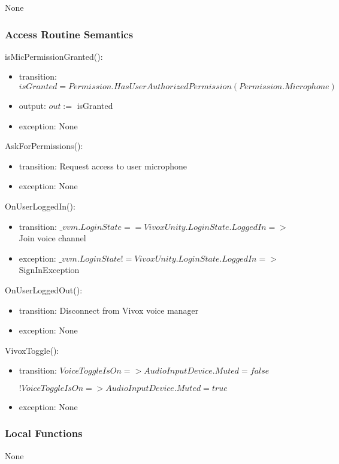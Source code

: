\documentclass[12pt, titlepage]{article}
\begin{document}
None\\

\subsubsection{Access Routine Semantics}

\noindent isMicPermissionGranted():
\begin{itemize}
\item transition: $isGranted = Permission.HasUserAuthorizedPermission(Permission.Microphone)$
\item output: $out :=$ isGranted
\item exception: None
\end{itemize}

\noindent AskForPermissions():
\begin{itemize}
\item transition: Request access to user microphone
\item exception: None
\end{itemize}

\noindent OnUserLoggedIn():
\begin{itemize}
\item transition: $\_vvm.LoginState == VivoxUnity.LoginState.LoggedIn =>$ Join voice channel
\item exception: $\_vvm.LoginState != VivoxUnity.LoginState.LoggedIn =>$ SignInException
\end{itemize}

\noindent OnUserLoggedOut():
\begin{itemize}
\item transition: Disconnect from Vivox voice manager
\item exception: None
\end{itemize}

\noindent VivoxToggle():
\begin{itemize}
\item transition: $VoiceToggleIsOn => AudioInputDevice.Muted = false$

$!VoiceToggleIsOn => AudioInputDevice.Muted = true$
\item exception: None
\end{itemize}

\subsubsection{Local Functions}

None
\end{document}
